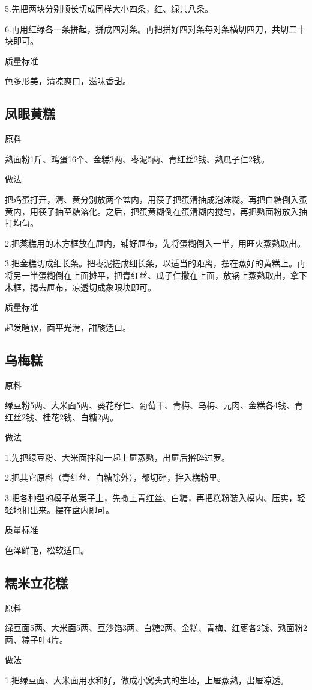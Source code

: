 \documentclass{ctexbook}
\begin{document}
5.先把两块分别顺长切成同样大小四条，红、绿共八条。

6.再用红绿各一条拼起，拼成四对条。再把拼好四对条每对条横切四刀，共切二十块即可。

质量标准

色多形美，清凉爽口，滋味香甜。
\subsection{凤眼黄糕}
原料

熟面粉1斤、鸡蛋16个、金糕3两、枣泥5两、青红丝2钱、熟瓜子仁2钱。

做法

把鸡蛋打开，清、黄分别放两个盆内，用筷子把蛋清抽成泡沫糊。再把白糖倒入蛋黄内，用筷子抽至糖溶化。之后，把蛋黄糊倒在蛋清糊内搅匀，再把熟面粉放入抽打均匀。

2.把蒸糕用的木方框放在屉内，铺好屉布，先将蛋糊倒入一半，用旺火蒸熟取出。

3.把金糕切成细长条。把枣泥搓成细长条，以适当的距离，摆在蒸好的黄糕上。再将另一半蛋糊倒在上面摊平，把青红丝、瓜子仁撒在上面，放锅上蒸熟取出，拿下木框，揭去屉布，凉透切成象眼块即可。

质量标准

起发暄软，面平光滑，甜酸适口。
\subsection{乌梅糕}
原料

绿豆粉5两、大米面5两、葵花籽仁、葡萄干、青梅、乌梅、元肉、金糕各4钱、青红丝2钱、桂花2钱、白糖2两。

做法

1.先把绿豆粉、大米面拌和一起上屉蒸熟，出屉后擀碎过罗。

2.把其它原料（青红丝、白糖除外），都切碎，拌入糕粉里。

3.把各种型的模子放案子上，先撒上青红丝、白糖，再把糕粉装入模内、压实，轻轻地扣出来。摆在盘内即可。

质量标准

色泽鲜艳，松软适口。
\subsection{糯米立花糕}
原料

绿豆面5两、大米面5两、豆沙馅3两、白糖2两、金糕、青梅、红枣各2钱、熟面粉2两、粽子叶4片。

做法

1.把绿豆面、大米面用水和好，做成小窝头式的生坯，上屉蒸熟，出屉凉透。
\end{document}

